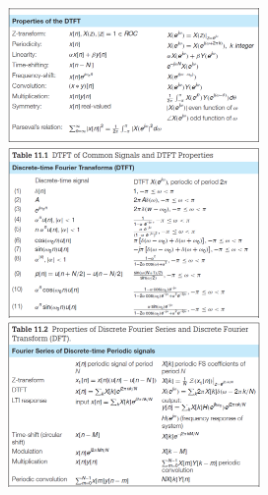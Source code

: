 \documentclass[12pt,landscape,letterpaper]{article}
\begin{document}
\begin{multicols*}{2}
    \includegraphics[width=0.5\textwidth]{dtft-props}
	\includegraphics[width=0.5\textwidth]{dtft-pairs}
	\includegraphics[width=0.5\textwidth]{dft-props}
\end{multicols*}

\newpage
\end{document}

